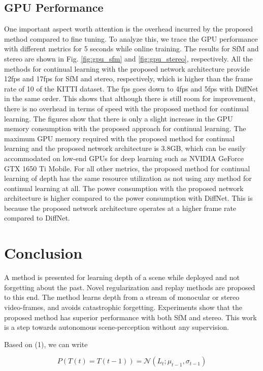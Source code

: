 \documentclass[lettersize,journal]{IEEEtran}
\begin{document}
 \subsection{GPU Performance}
 \noindent One important aspect worth attention is the overhead incurred by the proposed method compared to fine tuning. To analyze this, we trace the GPU performance with different metrics for 5 seconds while online training. The results for SfM and stereo are shown in Fig. \ref{fig:gpu_sfm} and \ref{fig:gpu_stereo}, respectively. All the methods for continual learning with the proposed network architecture provide 12fps and 17fps for SfM and stereo, respectively, which is higher than the frame rate of 10 of the KITTI dataset. The fps goes down to 4fps and 5fps with DiffNet \cite{zhou2021self} in the same order. This shows that although there is still room for improvement, there is no overhead in terms of speed with the proposed method for continual learning. The figures show that there is only a slight increase in the GPU memory consumption with the proposed approach for continual learning. The maximum GPU memory required with the proposed method for continual learning and the proposed network architecture is 3.8GB, which can be easily accommodated on low-end GPUs for deep learning such as NVIDIA GeForce GTX 1650 Ti Mobile. For all other metrics, the proposed method for continual learning of depth has the same resource utilization as not using any method for continual learning at all. The power consumption with the proposed network architecture is higher compared to the power consumption with DiffNet. This is because the proposed network architecture operates at a higher frame rate compared to DiffNet.  
 
 \section{Conclusion}
 \noindent A method is presented for learning depth of a scene while deployed and not forgetting about the past. Novel regularization and replay methods are proposed to this end. The method learns depth from a stream of monocular or stereo video-frames, and avoids catastrophic forgetting. Experiments show that the proposed method has superior performance with both SfM and stereo. This work is a step towards autonomous scene-perception without any supervision. 
 
 \appendix 
 Based on (1), we can write
 
 \begin{equation} 
 P(T(t) = T(t - 1)) = \mathcal{N}(L_t; \mu_{t-1}, \sigma_{t-1})
 \end{equation}
 
\end{document}
